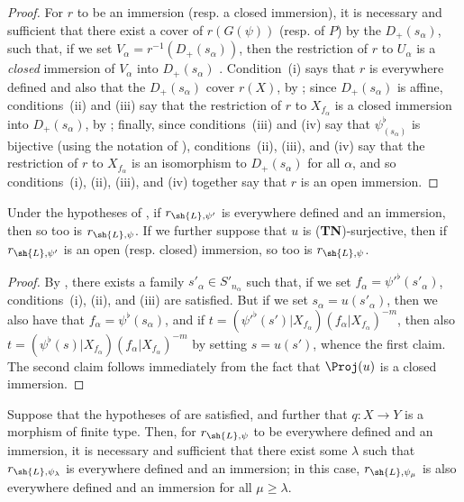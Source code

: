 \begin{proof}
For $r$ to be an immersion (resp. a closed immersion), it is necessary and sufficient that there exist a cover of $r(G(\psi))$ (resp. of $P$) by the $D_+(s_\alpha)$, such that, if we set $V_\alpha=r^{-1}(D_+(s_\alpha))$, then the restriction of $r$ to $U_\alpha$ is a \emph{closed} immersion of $V_\alpha$ into $D_+(s_\alpha)$ .
Condition~(i) says that $r$ is everywhere defined and also that the $D_+(s_\alpha)$ cover $r(X)$, by ;
since $D_+(s_\alpha)$ is affine, conditions~(ii) and (iii) say that the restriction of $r$ to $X_{f_\alpha}$ is a closed immersion into $D_+(s_\alpha)$, by ;
finally, since conditions~(iii) and (iv) say that $\psi_{(s_\alpha)}^\flat$ is bijective (using the notation of ), conditions~(ii), (iii), and (iv) say that the restriction of $r$ to $X_{f_\alpha}$ is an isomorphism to $D_+(s_\alpha)$ for all $\alpha$, and so conditions~(i), (ii), (iii), and (iv) together say that $r$ is an open immersion.
\end{proof}

\begin{corollary}[3.8.3]
\label{II.3.8.3}
Under the hypotheses of , if $r_{\sh{L},\psi'}$ is everywhere defined and an immersion, then so too is $r_{\sh{L},\psi}$.
If we further suppose that $u$ is (\textbf{TN})-surjective, then if $r_{\sh{L},\psi'}$ is an open (resp. closed) immersion, so too is $r_{\sh{L},\psi}$.
\end{corollary}

\begin{proof}
By , there exists a family $s'_\alpha\in S'_{n_\alpha}$ such that, if we set $f_\alpha=\psi'^\flat(s'_\alpha)$, conditions~(i), (ii), and (iii) are satisfied.
But if we set $s_\alpha=u(s'_\alpha)$, then we also have that $f_\alpha=\psi^\flat(s_\alpha)$, and if $t=(\psi'^\flat(s')|X_{f_\alpha})(f_\alpha|X_{f_\alpha})^{-m}$, then also $t=(\psi^\flat(s)|X_{f_\alpha})(f_\alpha|X_{f_\alpha})^{-m}$ by setting $s=u(s')$, whence the first claim.
The second claim follows immediately from the fact that $\Proj(u)$ is a closed immersion.
\end{proof}

\begin{proposition}[3.8.4]
\label{II.3.8.4}
Suppose that the hypotheses of  are satisfied, and further that $q:X\to Y$ is a morphism of finite type.
Then, for $r_{\sh{L},\psi}$ to be everywhere defined and an immersion, it is necessary and sufficient that there exist some $\lambda$ such that $r_{\sh{L},\psi_\lambda}$ is everywhere defined and an immersion;
in this case, $r_{\sh{L},\psi_\mu}$ is also everywhere defined and an immersion for all $\mu\geq\lambda$.
\end{proposition}

